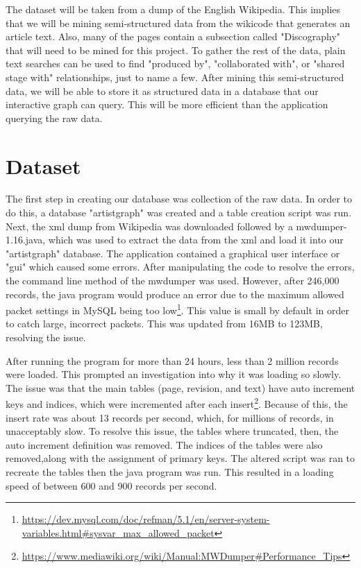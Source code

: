 \documentclass{sig-alternate}
\begin{document}
The dataset will be taken from a dump of the English Wikipedia. This implies 
that we will be mining semi-structured data from the wikicode that generates an 
article text. Also, many of the pages contain a subsection called "Discography" 
that will need to be mined for this project. To gather the rest of the data, 
plain text searches can be used to find "produced by", "collaborated with", 
or "shared stage with" relationships, just to name a few. After mining this 
semi-structured data, we will be able to store it as structured data in a database 
that our interactive graph can query. This will be more efficient than the 
application querying the raw data. 


\section{Dataset}
\label{dataset}

The first step in creating our database was collection of the raw data. 
In order to do this, a database "artistgraph" was created and a table creation
script was run. Next, the xml dump from Wikipedia was downloaded followed by a
mwdumper-1.16.java, which was used to extract the data from the xml and load it
into our "artistgraph" database. The application contained a graphical user interface
or "gui" which caused some errors. After manipulating the code to resolve the errors,
the command line method of the mwdumper was used. However, after 246,000 records, the 
java program would produce an error due to the maximum allowed packet settings in MySQL
being too low\footnote{\url{https://dev.mysql.com/doc/refman/5.1/en/server-system-variables.html#sysvar_max_allowed_packet}}.
This value is small by default in order to catch large, incorrect packets.
This was updated from 16MB to 123MB, resolving the issue.

After running the program
for more than 24 hours, less than 2 million records were loaded. This prompted an 
investigation into why it was loading so slowly. The issue was that the main tables 
(page, revision, and text) have auto increment keys and indices, which were incremented after each insert\footnote{\url{https://www.mediawiki.org/wiki/Manual:MWDumper#Performance_Tips}}.
Because of this, the insert rate was about 13 records per second, which, for
millions of records, in unacceptably slow. To resolve this issue, the tables
where truncated, then, the auto increment definition was removed. The indices
of the tables were also removed,along with the assignment of primary keys. The altered
script was ran to recreate the tables then the java program was run. This resulted
in a loading speed of between 600 and 900 records per second. 
\end{document}
